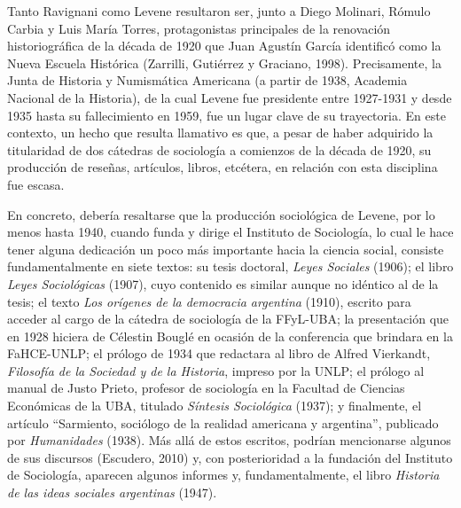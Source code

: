 Tanto Ravignani como Levene resultaron ser, junto a Diego Molinari, Rómulo Carbia y Luis María Torres, protagonistas principales de la renovación historiográfica de la década de 1920 que Juan Agustín García identificó como la Nueva Escuela Histórica (Zarrilli, Gutiérrez y Graciano, 1998). Precisamente, la Junta de Historia y Numismática Americana (a partir de 1938, Academia Nacional de la Historia), de la cual Levene fue presidente entre 1927-1931 y desde 1935 hasta su fallecimiento en 1959, fue un lugar clave de su trayectoria. En este contexto, un hecho que resulta llamativo es que, a pesar de haber adquirido la titularidad de dos cátedras de sociología a comienzos de la década de 1920, su producción de reseñas, artículos, libros, etcétera, en relación con esta disciplina fue escasa.

En concreto, debería resaltarse que la producción sociológica de Levene, por lo menos hasta 1940, cuando funda y dirige el Instituto de Sociología, lo cual le hace tener alguna dedicación un poco más importante hacia la ciencia social, consiste fundamentalmente en siete textos: su tesis doctoral, \emph{Leyes Sociales} (1906); el libro \emph{Leyes Sociológicas} (1907), cuyo contenido es similar aunque no idéntico al de la tesis; el texto \emph{Los orígenes de la democracia argentina} (1910), escrito para acceder al cargo de la cátedra de sociología de la FFyL-UBA; la presentación que en 1928 hiciera de Célestin Bouglé en ocasión de la conferencia que brindara en la FaHCE-UNLP; el prólogo de 1934 que redactara al libro de Alfred Vierkandt, \emph{Filosofía de la Sociedad y de la Historia}, impreso por la UNLP; el prólogo al manual de Justo Prieto, profesor de sociología en la Facultad de Ciencias Económicas de la UBA, titulado \emph{Síntesis Sociológica} (1937); y finalmente, el artículo ``Sarmiento, sociólogo de la realidad americana y argentina'', publicado por \emph{Humanidades} (1938). Más allá de estos escritos, podrían mencionarse algunos de sus discursos (Escudero, 2010) y, con posterioridad a la fundación del Instituto de Sociología, aparecen algunos informes y, fundamentalmente, el libro \emph{Historia de las ideas sociales argentinas} (1947).

